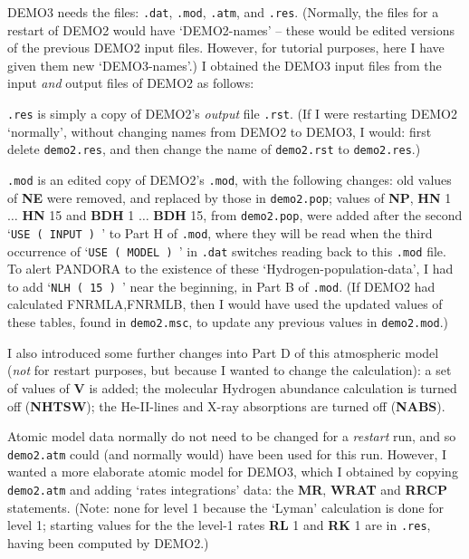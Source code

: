 DEMO3 needs the files: {\tt .dat}, {\tt .mod}, {\tt .atm}, and
{\tt .res}. (Normally, the
files for a restart of DEMO2 would have `DEMO2-names' -- these would be edited
versions of the previous DEMO2 input files. However, for tutorial
purposes, here I have given them new `DEMO3-names'.) I obtained the DEMO3
input files from the input {\it and} output files of DEMO2 as follows:

{\tt .res} is simply a copy of DEMO2's {\it output} file {\tt .rst}.
(If I were restarting \break DEMO2 `normally', without changing 
names from DEMO2 to DEMO3,
I would: \break first delete {\tt demo2.res}, and then change the name of
{\tt demo2.rst} to {\tt demo2.res}.) 

{\tt .mod} is an edited copy of DEMO2's {\tt .mod}, with the following changes:
\bull old values of {\bf NE} were removed, and replaced by those in
{\tt demo2.pop};
\bull values of {\bf NP}, {\bf HN} 1  $\ldots$  {\bf HN} 15 and 
{\bf BDH} 1  $\ldots$  {\bf BDH} 15, from {\tt demo2.pop}, were added after
the second `{\tt USE ( INPUT ) }' to Part H of {\tt .mod},
where they will be read when the third occurrence of `{\tt USE ( MODEL ) }'
in {\tt .dat} switches reading back to this {\tt .mod} file.
To alert PANDORA to the existence of these 
\break `Hydrogen-population-data', I had to add `{\tt NLH ( 15 ) }'
near the beginning, in \break Part B of {\tt .mod}.
(If DEMO2 had calculated FNRMLA,FNRMLB, then I would have used the
updated values of these tables, found in {\tt demo2.msc}, to update
any previous values in {\tt demo2.mod}.) \par

I also introduced some further changes into Part D of this atmospheric model
({\it not} for restart purposes, but because I wanted to change 
the calculation):
\bull a set of values of {\bf V} is added;
\bull the molecular Hydrogen abundance calculation is turned off ({\bf NHTSW});
\bull the He-II-lines and X-ray absorptions are turned off ({\bf NABS}).

Atomic model data normally do not need to be changed for a {\it restart} run,
and so {\tt demo2.atm} could (and normally would) have been used for this
run. However, I wanted a more elaborate atomic model for DEMO3, which I
obtained by copying {\tt demo2.atm} and adding `rates integrations' data:
the {\bf MR}, {\bf WRAT} and {\bf RRCP} statements. (Note: none for level 1
because the `Lyman' calculation is done for level 1; starting values for the
the level-1 rates {\bf RL} 1 and {\bf RK} 1 are in {\tt .res}, having been
computed by DEMO2.)

